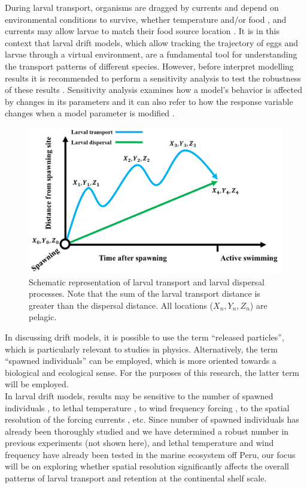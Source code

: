 During larval transport, organisms are dragged by currents and depend on environmental conditions to survive, whether temperature and/or food \citep{NocrShaw1984}, and currents may allow larvae to match their food source location \citep{CuryRoy1989}. It is in this context that larval drift models, which allow tracking the trajectory of eggs and larvae through a virtual environment, are a fundamental tool for understanding the transport patterns of different species. However, before interpret modelling results it is recommended to perform a sensitivity analysis to test the robustness of these results \citep{PeckHufn2012,SimoSieg2013}. Sensitivity analysis examines how a model's behavior is affected by changes in its parameters and it can also refer to how the response variable changes when a model parameter is modified \citep{Hamb1994,Inga2008}.\\

\begin{figure}[H]
	\includegraphics[width=1.0\textwidth]{figures/Chap2LarvalTransport.png}
	\centering
	\caption{Schematic representation of larval transport and larval dispersal processes. Note that the sum of the larval transport distance is greater than the dispersal distance. All locations ($X_{n},Y_{n},Z_{n}$) are pelagic.}
	\label{Chap2LarvalTransport}
\end{figure}

In discussing drift models, it is possible to use the term ``released particles'', which is particularly relevant to studies in physics. Alternatively, the term ``spawned individuals'' can be employed, which is more oriented towards a biological and ecological sense. For the purposes of this research, the latter term will be employed.\\

In larval drift models, results may be sensitive to the number of spawned individuals \citep{SimoSieg2013}, to lethal temperature \citep{BrocLett2008}, to wind frequency forcing \citep{FlorTam2019}, to the spatial resolution of the forcing currents \citep{GaraKapl2014}, etc. Since number of spawned individuals has already been thoroughly studied and we have determined a robust number in previous experiments (not shown here), and lethal temperature and wind frequency have already been tested in the marine ecosystem off Peru, our focus will be on exploring whether spatial resolution significantly affects the overall patterns of larval transport and retention at the continental shelf scale.\\

